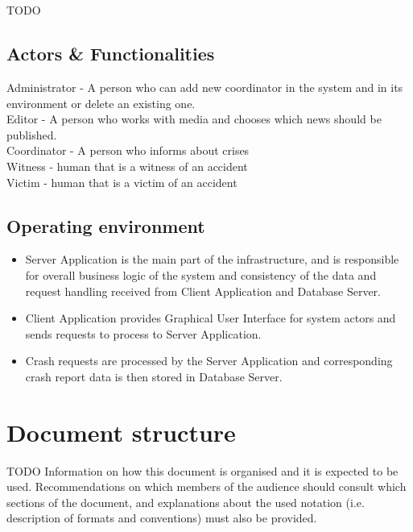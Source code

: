 \section{\mysystemname}
TODO

\subsection{Actors \& Functionalities}
Administrator - A person who can add new coordinator in the system and in its
environment or delete an existing one.\\
Editor - A person who works with media and chooses which news should be
published. \\
Coordinator - A person who informs about crises \\
Witness - human that is a witness of an accident 	\\
Victim - human that is a victim of an accident



\subsection{Operating environment}
\begin{itemize}
\item Server Application is the main part of the infrastructure, and is
responsible for overall business logic of the system and consistency of the data and request
handling received from Client Application and Database Server.
\item Client Application provides Graphical User Interface for system actors and
sends requests to process to Server Application.
\item Crash requests are processed by the Server Application and corresponding
crash report data is then stored in Database Server. 
\end{itemize}
\section{Document structure} 
TODO 
Information on how this document is organised and it is expected to be
used. Recommendations on which members of the audience
should consult which sections of the document, and explanations about the used
notation (i.e. description of formats and conventions) must also be provided.






